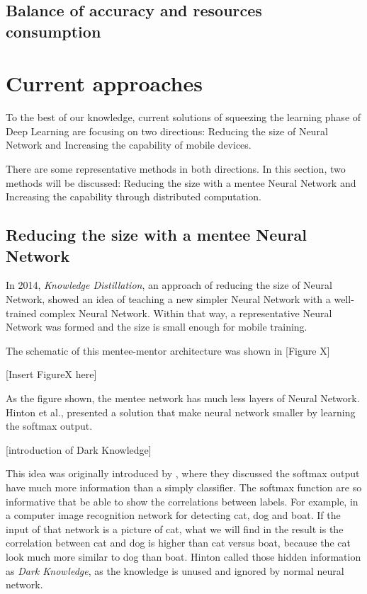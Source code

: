 \documentclass[article]{aaltoseries}
\begin{document}
\subsection{Balance of accuracy and resources consumption}







\section{Current approaches}




To the best of our knowledge, current solutions of squeezing the learning phase of Deep Learning are focusing on two directions:
Reducing the size of Neural Network and Increasing the capability of mobile devices.

There are some representative methods in both directions. 
In this section, two methods will be discussed:
Reducing the size with a mentee Neural Network and Increasing the capability through distributed computation.


\subsection{Reducing the size with a mentee Neural Network}

In 2014, \emph{Knowledge Distillation}, an approach of reducing the size of Neural Network, 
showed an idea of teaching a new simpler Neural Network with a well-trained complex Neural Network.
Within that way, a representative Neural Network was formed and the size is small enough for mobile training.

The schematic of this mentee-mentor architecture was shown in [Figure X]

[Insert FigureX here]

As the figure shown, the mentee network has much less layers of Neural Network. 
Hinton et al., presented a solution that make neural network smaller by learning the 
softmax output. 

[introduction of Dark Knowledge]

This idea was originally introduced by \cite{Caruana2006}, where they discussed 
the softmax output have much more information than a simply classifier. 
The softmax function are so informative that be able to show the correlations between
labels. For example, in a computer image recognition network for detecting cat, dog and boat.
If the input of that network is a picture of cat, what we will find in the result is the correlation
between cat and dog is higher than cat versus boat, because the cat look much more similar to dog than boat.
Hinton called those hidden information as \emph{Dark Knowledge}, as the knowledge is unused and ignored by 
normal neural network.
\end{document}
